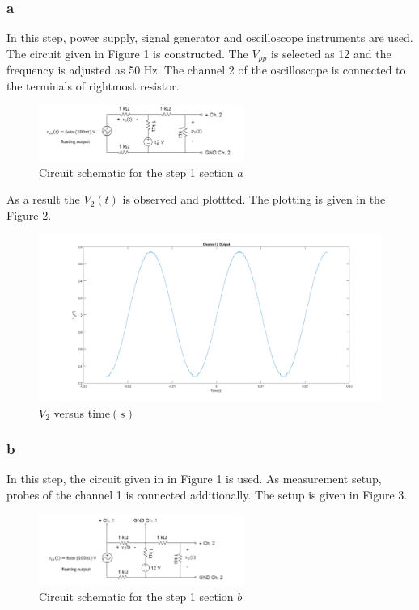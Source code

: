 \documentclass[letterpaper,12pt]{article}
\begin{document}
\subsubsection{a} In this step, power supply, signal generator and oscilloscope instruments are used. The circuit given in Figure 1 is constructed. The \(V_{pp}\) is selected as 12 and the frequency is adjusted as 50 Hz. The channel 2 of the oscilloscope is connected to the terminals of rightmost resistor. 
\begin{figure}[H]
	\centering
   \includegraphics[width=0.6\textwidth]{1a_sch.png}
   \caption{Circuit schematic for the step 1 section \(a\)}
\end{figure} 
As a result the \(V_2(t)\) is observed and plottted. The plotting is given in the Figure 2. 
\begin{figure}[H]
	\centering
   \includegraphics[width=1\textwidth]{1a.png}
   \caption{\(V_2\) versus time\((s)\) }
\end{figure} 


\subsubsection{b} 
In this step, the circuit given in in Figure 1 is used. As measurement setup, probes of the channel 1 is connected additionally. The setup is given in Figure 3. 

\begin{figure}[H]
	\centering
   \includegraphics[width=0.6\textwidth]{1b_sch.png}
   \caption{Circuit schematic for the step 1 section \(b\)}
\end{figure} 
\end{document}
